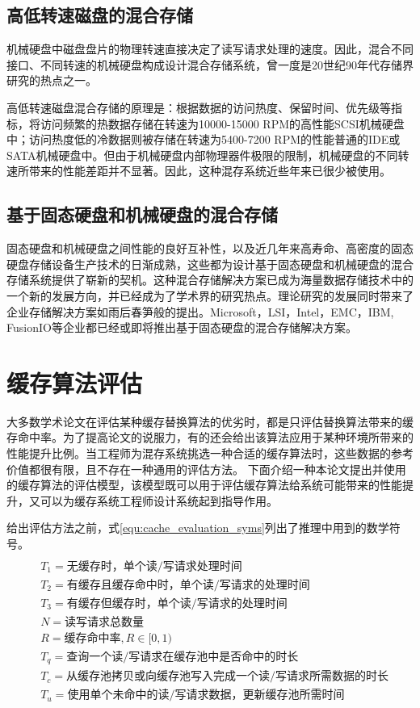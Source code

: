 \subsection{高低转速磁盘的混合存储}

机械硬盘中磁盘盘片的物理转速直接决定了读写请求处理的速度。因此，混合不同接口、不同转速的机械硬盘构成设计混合存储系统，曾一度是20世纪90年代存储界研究的热点之一。

高低转速磁盘混合存储的原理是：根据数据的访问热度、保留时间、优先级等指标，将访问频繁的热数据存储在转速为10000-15000 RPM的高性能SCSI机械硬盘中；访问热度低的冷数据则被存储在转速为5400-7200 RPM的性能普通的IDE或SATA机械硬盘中。但由于机械硬盘内部物理器件极限的限制，机械硬盘的不同转速所带来的性能差距并不显著。因此，这种混存系统近些年来已很少被使用。

\subsection{基于固态硬盘和机械硬盘的混合存储}

固态硬盘和机械硬盘之间性能的良好互补性，以及近几年来高寿命、高密度的固态硬盘存储设备生产技术的日渐成熟，这些都为设计基于固态硬盘和机械硬盘的混合存储系统提供了崭新的契机。这种混合存储解决方案已成为海量数据存储技术中的一个新的发展方向，并已经成为了学术界的研究热点。理论研究的发展同时带来了企业存储解决方案如雨后春笋般的提出。Microsoft，LSI，Intel，EMC，IBM, FusionIO等企业都已经或即将推出基于固态硬盘的混合存储解决方案。

\section{缓存算法评估}
\label{sec:cache_evaluation}

大多数学术论文在评估某种缓存替换算法的优劣时，都是只评估替换算法带来的缓存命中率。为了提高论文的说服力，有的还会给出该算法应用于某种环境所带来的性能提升比例。当工程师为混存系统挑选一种合适的缓存算法时，这些数据的参考价值都很有限，且不存在一种通用的评估方法。
下面介绍一种本论文提出并使用的缓存算法的评估模型，该模型既可以用于评估缓存算法给系统可能带来的性能提升，又可以为缓存系统工程师设计系统起到指导作用。

给出评估方法之前，式\ref{equ:cache_evaluation_syms}列出了推理中用到的数学符号。
\begin{equation}
\begin{split}
\\&T_1=\mbox{无缓存时，单个读/写请求处理时间}
\\&T_2=\mbox{有缓存且缓存命中时，单个读/写请求的处理时间}
\\&T_3=\mbox{有缓存但缓存时，单个读/写请求的处理时间}
\\&N=\mbox{读写请求总数量}
\\&R=\mbox{缓存命中率},R\in\lbrack0,1)
\\&T_q=\mbox{查询一个读/写请求在缓存池中是否命中的时长}
\\&T_c=\mbox{从缓存池拷贝或向缓存池写入完成一个读/写请求所需数据的时长}
\\&T_u=\mbox{使用单个未命中的读/写请求数据，更新缓存池所需时间}
\end{split}
\label{equ:cache_evaluation_syms}
\end{equation}

